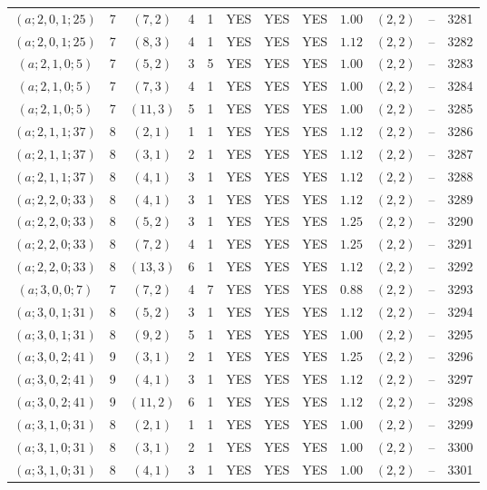 \begin{longtable}{|c|c|c|c|c|c|c|c|c|c|c|c|}
$(a;2,0,1;25)$ & 7 & $(7,2)$ & 4 & 1 & YES & YES & YES & $1.00$ & $(2,2)$ & -- & 3281\\
$(a;2,0,1;25)$ & 7 & $(8,3)$ & 4 & 1 & YES & YES & YES & $1.12$ & $(2,2)$ & -- & 3282\\
$(a;2,1,0;5)$ & 7 & $(5,2)$ & 3 & 5 & YES & YES & YES & $1.00$ & $(2,2)$ & -- & 3283\\
$(a;2,1,0;5)$ & 7 & $(7,3)$ & 4 & 1 & YES & YES & YES & $1.00$ & $(2,2)$ & -- & 3284\\
$(a;2,1,0;5)$ & 7 & $(11,3)$ & 5 & 1 & YES & YES & YES & $1.00$ & $(2,2)$ & -- & 3285\\
$(a;2,1,1;37)$ & 8 & $(2,1)$ & 1 & 1 & YES & YES & YES & $1.12$ & $(2,2)$ & -- & 3286\\
$(a;2,1,1;37)$ & 8 & $(3,1)$ & 2 & 1 & YES & YES & YES & $1.12$ & $(2,2)$ & -- & 3287\\
$(a;2,1,1;37)$ & 8 & $(4,1)$ & 3 & 1 & YES & YES & YES & $1.12$ & $(2,2)$ & -- & 3288\\
$(a;2,2,0;33)$ & 8 & $(4,1)$ & 3 & 1 & YES & YES & YES & $1.12$ & $(2,2)$ & -- & 3289\\
$(a;2,2,0;33)$ & 8 & $(5,2)$ & 3 & 1 & YES & YES & YES & $1.25$ & $(2,2)$ & -- & 3290\\
$(a;2,2,0;33)$ & 8 & $(7,2)$ & 4 & 1 & YES & YES & YES & $1.25$ & $(2,2)$ & -- & 3291\\
$(a;2,2,0;33)$ & 8 & $(13,3)$ & 6 & 1 & YES & YES & YES & $1.12$ & $(2,2)$ & -- & 3292\\
$(a;3,0,0;7)$ & 7 & $(7,2)$ & 4 & 7 & YES & YES & YES & $0.88$ & $(2,2)$ & -- & 3293\\
$(a;3,0,1;31)$ & 8 & $(5,2)$ & 3 & 1 & YES & YES & YES & $1.12$ & $(2,2)$ & -- & 3294\\
$(a;3,0,1;31)$ & 8 & $(9,2)$ & 5 & 1 & YES & YES & YES & $1.00$ & $(2,2)$ & -- & 3295\\
$(a;3,0,2;41)$ & 9 & $(3,1)$ & 2 & 1 & YES & YES & YES & $1.25$ & $(2,2)$ & -- & 3296\\
$(a;3,0,2;41)$ & 9 & $(4,1)$ & 3 & 1 & YES & YES & YES & $1.12$ & $(2,2)$ & -- & 3297\\
$(a;3,0,2;41)$ & 9 & $(11,2)$ & 6 & 1 & YES & YES & YES & $1.12$ & $(2,2)$ & -- & 3298\\
$(a;3,1,0;31)$ & 8 & $(2,1)$ & 1 & 1 & YES & YES & YES & $1.00$ & $(2,2)$ & -- & 3299\\
$(a;3,1,0;31)$ & 8 & $(3,1)$ & 2 & 1 & YES & YES & YES & $1.00$ & $(2,2)$ & -- & 3300\\
$(a;3,1,0;31)$ & 8 & $(4,1)$ & 3 & 1 & YES & YES & YES & $1.00$ & $(2,2)$ & -- & 3301\\

\end{longtable}
